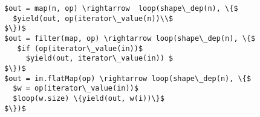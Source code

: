 % 
% 



\begin{lstlisting}[name=code, caption=Lowering transformations., captionpos=b, label=lst:lowering, float=t]
$out = map(n, op) \rightarrow  loop(shape\_dep(n), \{$
  $yield(out, op(iterator\_value(n))\\$
$\})$
$out = filter(map, op) \rightarrow loop(shape\_dep(n), \{$
   $if (op(iterator\_value(in))$
     $yield(out, iterator\_value(in)) $
$\})$
$out = in.flatMap(op) \rightarrow loop(shape\_dep(n), \{$
  $w = op(iterator\_value(in))$
  $loop(w.size) \{yield(out, w(i))\}$
$\})$
\end{lstlisting}


